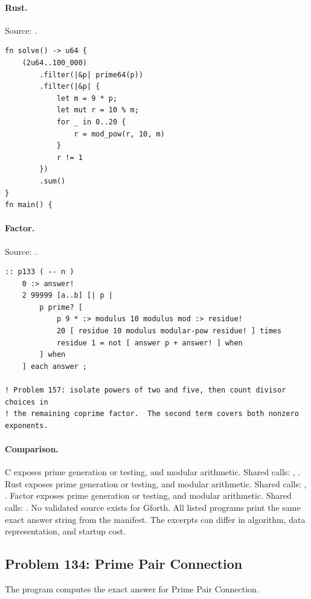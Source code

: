 \paragraph{Rust.} Source: .
\begin{lstlisting}
fn solve() -> u64 {
    (2u64..100_000)
        .filter(|&p| prime64(p))
        .filter(|&p| {
            let m = 9 * p;
            let mut r = 10 % m;
            for _ in 0..20 {
                r = mod_pow(r, 10, m)
            }
            r != 1
        })
        .sum()
}
fn main() {
\end{lstlisting}

\paragraph{Factor.} Source: .
\begin{lstlisting}
:: p133 ( -- n )
    0 :> answer!
    2 99999 [a..b] [| p |
        p prime? [
            p 9 * :> modulus 10 modulus mod :> residue!
            20 [ residue 10 modulus modular-pow residue! ] times
            residue 1 = not [ answer p + answer! ] when
        ] when
    ] each answer ;

! Problem 157: isolate powers of two and five, then count divisor choices in
! the remaining coprime factor.  The second term covers both nonzero exponents.
\end{lstlisting}

\paragraph{Comparison.}
C exposes prime generation or testing, and modular arithmetic. Shared calls: \texttt{}, \texttt{}. Rust exposes prime generation or testing, and modular arithmetic. Shared calls: \texttt{}, \texttt{}. Factor exposes prime generation or testing, and modular arithmetic. Shared calls: \texttt{}.
No validated source exists for Gforth.
All listed programs print the same exact answer string from the manifest. The excerpts can differ in algorithm, data representation, and startup cost.

\subsection{Problem 134: Prime Pair Connection}
\label{walkthrough:p134}
The program computes the exact answer for Prime Pair Connection.

